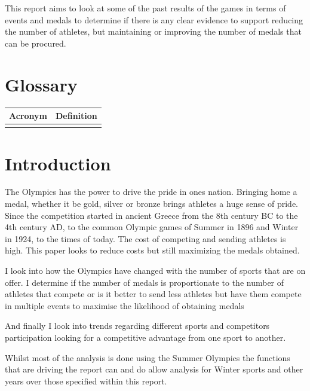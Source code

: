 \documentclass[
]{article}
\begin{document}
This report aims to look at some of the past results of the games in terms of events and medals to determine if there is any clear evidence to support reducing the number of athletes, but maintaining or improving the number of medals that can be procured.

\newpage
\tableofcontents

\section*{Glossary}\label{glossary}

\begin{longtable}[l]{>{}ll}
\toprule
Acronym & Definition\\
\midrule
\textbf{\cellcolor{gray!10}{NOC}} & \cellcolor{gray!10}{National Olympic Committee}\\
\bottomrule
\end{longtable}

\newpage

\section*{Introduction}\label{introduction}

The Olympics has the power to drive the pride in ones nation. Bringing home a medal, whether it be gold, silver or bronze brings athletes a huge sense of pride. Since the competition started in ancient Greece from the 8th century BC to the 4th century AD, to the common Olympic games of Summer in 1896 and Winter in 1924, to the times of today. The cost of competing and sending athletes is high. This paper looks to reduce costs but still maximizing the medals obtained.

I look into how the Olympics have changed with the number of sports that are on offer. I determine if the number of medals is proportionate to the number of athletes that compete or is it better to send less athletes but have them compete in multiple events to maximise the likelihood of obtaining medals

And finally I look into trends regarding different sports and competitors participation looking for a competitive advantage from one sport to another.

Whilst most of the analysis is done using the Summer Olympics the functions that are driving the report can and do allow analysis for Winter sports and other years over those specified within this report.
\end{document}
